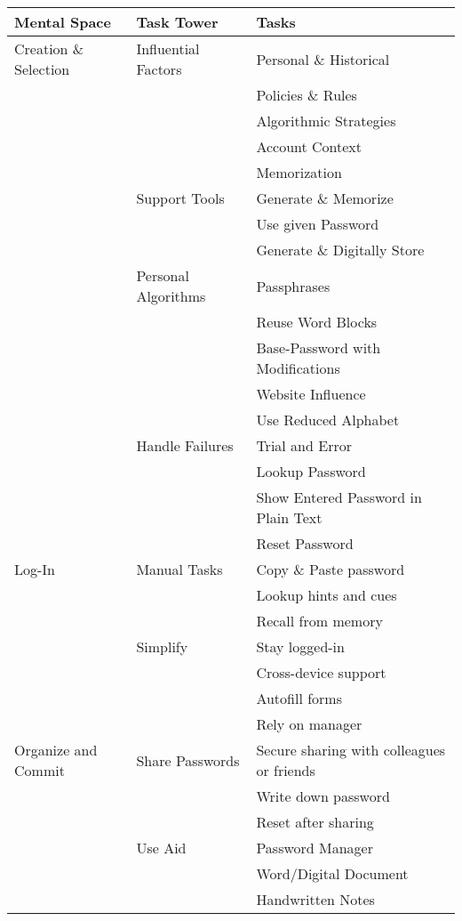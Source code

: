 \begin{table}[htpb]
\def\arraystretch{1.05}%
\begin{threeparttable}
\begin{tabular} {l|l|l}
\textbf{Mental Space} & \textbf{Task Tower} & \textbf{Tasks} \\ \hline\hline
Creation \& Selection
& Influential Factors & Personal \& Historical \\ 
& & Policies \& Rules \\
& & Algorithmic Strategies \\
& & Account Context \\
& & Memorization \\ \cline{2-3}
& Support Tools & Generate \& Memorize \\
& & Use given Password \\
& & Generate \& Digitally Store \\ \cline{2-3}
& Personal Algorithms & Passphrases \\
& & Reuse Word Blocks \\
& & Base-Password with Modifications \\
& & Website Influence \\
& & Use Reduced Alphabet \\\cline{2-3}
& Handle Failures & Trial and Error \\ 
& & Lookup Password \\
& & Show Entered Password in Plain Text\\
& & Reset Password \\ \hline 
Log-In 	& Manual Tasks 	& Copy \& Paste password \\
	 	& 		 	& Lookup hints and cues \\ 
	 	& 		 	& Recall from memory \\ 
\cline{2-3}
		& Simplify 	& Stay logged-in \\ 
		& 			& Cross-device support \\ 
		& 			& Autofill forms \\ 
		& 			& Rely on manager \\ \hline
Organize and Commit & Share Passwords & Secure sharing with colleagues or friends \\
		&			& Write down password \\
		&			& Reset after sharing\\ \cline{2-3}
		& Use Aid & Password Manager \\
		& 		 	& Word/Digital Document \\ 
		& 		 	& Handwritten Notes \\  \cline{2-3}

\end{tabular}
\end{threeparttable}
\end{table}
